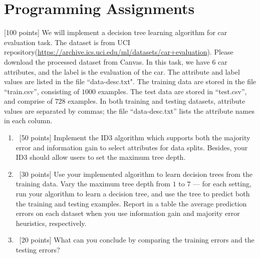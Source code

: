 \documentclass[12pt, fullpage,letterpaper]{article}
\begin{document}
\section{Programming Assignments}
[100 points] We will implement a decision tree learning algorithm for car evaluation task. The dataset is from UCI repository(\url{https://archive.ics.uci.edu/ml/datasets/car+evaluation}). Please download the processed dataset from Canvas.  In this task, we have $6$ car attributes, and the label is the evaluation of the car. The attribute and label values are listed in the file ``data-desc.txt". The training data are stored in the file ``train.csv'', consisting of $1000$ examples. The test data are stored in ``test.csv'', and comprise of $728$ examples. In both training and testing datasets, attribute values are separated by commas; the file ``data-desc.txt''  lists the attribute names in each column. 
\begin{enumerate}
\item~[50 points] Implement the ID3 algorithm which supports both the majority error and information gain to select attributes for data splits. Besides, your ID3 should allow users to set the maximum tree depth. 
\item~[30 points] Use your implemented algorithm to learn decision trees from the training data. Vary the maximum  tree depth from $1$ to $7$ --- for each setting, run your algorithm to learn a decision tree, and use the tree to  predict both the training  and testing examples. Report in a table the average prediction errors on each dataset when you use information gain and majority error heuristics, respectively.

\item~[20 points] What can you conclude by comparing the training errors and the testing errors? 
\end{enumerate}
\end{document}
